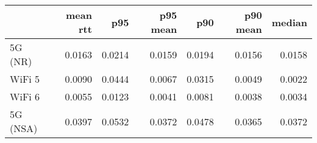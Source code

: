 \begin{tabular}{l|rrrrrr}
\rowcolor{gray!50}
 & mean rtt & p95 & p95 mean & p90 & p90 mean & median\\\hline
5G (NR) & 0.0163 & 0.0214 & 0.0159 & 0.0194 & 0.0156 & 0.0158 \\
WiFi 5 & 0.0090 & 0.0444 & 0.0067 & 0.0315 & 0.0049 & 0.0022 \\
WiFi 6 & 0.0055 & 0.0123 & 0.0041 & 0.0081 & 0.0038 & 0.0034 \\
5G (NSA) & 0.0397 & 0.0532 & 0.0372 & 0.0478 & 0.0365 & 0.0372 \\
\end{tabular}

